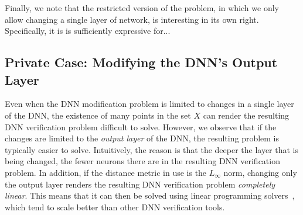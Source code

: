 \documentclass{easychair}
\newcommand{\guy}[1]{\marginpar{\textcolor{orange}{Guy: #1}}}
\begin{document}
Finally, we note that the restricted version of the problem, in which
we only allow changing a single layer of network, is interesting in
its own right. Specifically, it is is sufficiently expressive for...
\guy{TODO: justify why this is interesting}


\subsection{Private Case: Modifying the DNN's Output Layer}
\label{sec:outputLayer}

Even when the DNN modification problem is limited to changes in a
single layer of the DNN, the existence of many points in the set $X$
can render the resulting DNN verification problem difficult to
solve. However,  we observe that if the changes are limited to the \emph{output
  layer} of the DNN, the resulting problem is typically easier to
solve. Intuitively, the reason is that the deeper the layer that is being changed,
the fewer neurons there are in the resulting DNN verification problem.
In addition, if the distance metric in use is the $L_\infty$ norm,
changing only the output layer renders the resulting DNN verification
problem \emph{completely linear}. This means that it can then be solved using
linear programming solvers~\cite{TjXiTe19}, which tend to scale better than other DNN
verification tools.
\end{document}

